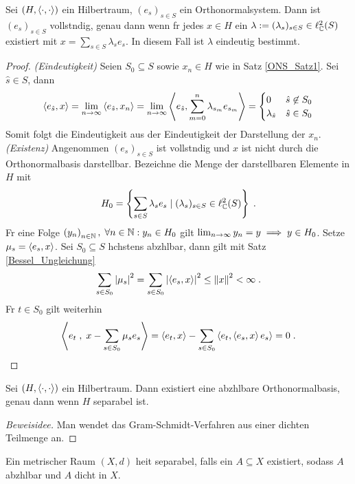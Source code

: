 \begin{theorem}
Sei \((H,\left\langle\cdot, \cdot\right\rangle)\) ein Hilbertraum, \((e_s)_{s\in S}\) ein Orthonormalsystem. Dann ist \((e_s)_{s\in S}\) vollst\as ndig, genau dann wenn f\us r jedes \(x\in H\) ein \(\lambda := (\lambda_s)_{s\in S} \in \ell_{\mathbb{C}}^2(S)\) existiert mit \(x = \sum_{s\in S} \lambda_s e_s\). In diesem Fall ist \(\lambda\) eindeutig bestimmt.
\end{theorem}
\begin{proof}
	\textit{(Eindeutigkeit)} Seien \(S_0 \subseteq S\) sowie \(x_n \in H\) wie in Satz \ref{ONS_Satz1}. Sei \(\hat s \in S\), dann
	\[\left\langle e_{\hat s}, x\right\rangle = \lim_{n \to\infty} \left\langle e_{\hat s}, x_n\right\rangle = \lim_{n \to\infty} \left\langle e_{\hat s}, \sum_{m=0}^n \lambda_{s_m} e_{s_m}\right\rangle= \begin{cases}0 & \hat s\not\in S_0 \\ \lambda_{\hat s} & \hat s \in S_0\end{cases}\]
	Somit folgt die Eindeutigkeit aus der Eindeutigkeit der Darstellung der \(x_n\).\\
	\textit{(Existenz)}
	Angenommen \((e_s)_{s\in S} \) ist vollst\as ndig und \(x\) ist nicht durch die Orthonormalbasis darstellbar. Bezeichne die Menge der darstellbaren Elemente in $H$ mit
	\[H_0 = \left\{\sum_{s\in S} \lambda_s e_s \;\vert\; (\lambda_s)_{s\in S} \in \ell^2_{\mathbb{C}}(S)\right\}\;.\]	
	F\us r eine Folge \(\left (y_n\right )_{n\in \mathbb{N}},\; \forall n \in \mathbb{N}: y_n \in H_0\) gilt \(\lim_{n \to \infty} y_n = y \implies y \in H_0\). Setze \(\mu_s = \left\langle e_s, x\right\rangle\). Sei \(S_0 \subseteq S\) h\os chstens abz\as hlbar, dann gilt mit Satz \ref{Bessel_Ungleichung}
	\[\sum_{s\in S_0} \left\lvert \mu_s \right\rvert^2 = \sum_{s\in S_0} \left\lvert \left\langle e_s, x\right\rangle \right\rvert^2 \leq \left\lVert x\right\rVert^2 < \infty\;.\]
	F\us r \(t\in S_0\) gilt weiterhin
	\[\left\langle e_t\;, \;x - \sum_{s\in S_0} \mu_s e_s\right\rangle = \left\langle e_t,x\right\rangle - \sum_{s\in S_0} \left\langle e_t,\left\langle e_s, x\right\rangle e_s\right\rangle = 0 \;. \]
\end{proof}

\begin{theorem}
	Sei \((H,\left\langle\cdot, \cdot\right\rangle)\) ein Hilbertraum. Dann existiert eine abz\as hlbare Orthonormalbasis, genau dann wenn $H$ separabel ist. 
\end{theorem}
\begin{proof}[Beweisidee]
	Man wendet das Gram-Schmidt-Verfahren aus einer dichten Teilmenge an.
\end{proof}
\begin{rem}
	Ein metrischer Raum \((X,d)\) hei\s t separabel, falls ein \(A \subseteq X\) existiert, sodass $A$ abz\as hlbar und $A$ dicht in $X$.
\end{rem}

